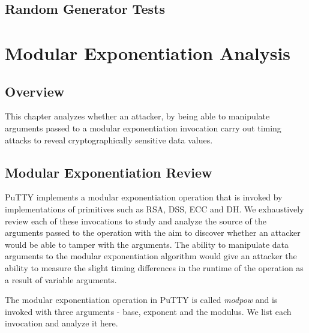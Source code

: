\documentclass{report}
\begin{document}
\section{Random Generator Tests}

\chapter{Modular Exponentiation Analysis}
\section{Overview}
This chapter analyzes whether an attacker, by being able to manipulate arguments passed to a modular exponentiation invocation carry out timing attacks to reveal cryptographically sensitive data values.
\section{Modular Exponentiation Review}
PuTTY implements a modular exponentiation operation that is invoked by implementations of primitives such as RSA, DSS, ECC and DH. We exhaustively review each of these invocations to study and analyze the source of the arguments passed to the operation with the aim to discover whether an attacker would be able to tamper with the arguments. The ability to manipulate data arguments to the modular exponentiation algorithm would give an attacker the ability to measure the slight timing differences in the runtime of the operation as a result of variable arguments.\par
The modular exponentiation operation in PuTTY is called \textit{modpow} and is invoked with three arguments - base, exponent and the modulus. We list each invocation and analyze it here.\par
\clearpage
\end{document}
